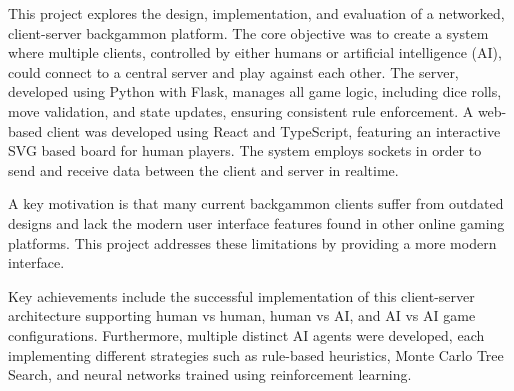 This project explores the design, implementation, and evaluation of a networked, client-server backgammon platform. The core objective was to create a system where multiple clients, controlled by either humans or artificial intelligence (AI), could connect to a central server and play against each other. The server, developed using Python with Flask, manages all game logic, including dice rolls, move validation, and state updates, ensuring consistent rule enforcement. A web-based client was developed using React and TypeScript, featuring an interactive SVG based board for human players. The system employs sockets in order to send and receive data between the client and server in realtime.  

A key motivation is that many current backgammon clients suffer from outdated designs and lack the modern user interface features found in other online gaming platforms. This project addresses these limitations by providing a more modern interface.

Key achievements include the successful implementation of this client-server architecture supporting human vs human, human vs AI, and AI vs AI game configurations. Furthermore, multiple distinct AI agents were developed, each implementing different strategies such as rule-based heuristics, Monte Carlo Tree Search, and neural networks trained using reinforcement learning. 